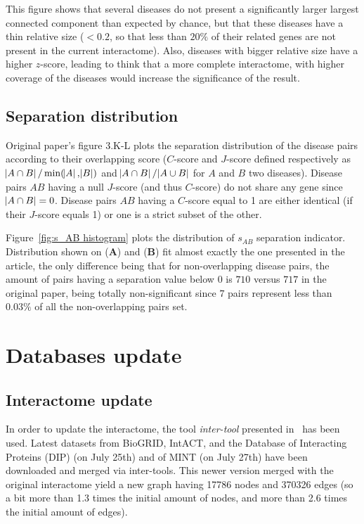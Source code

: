 \documentclass[letterpaper]{article}
\begin{document}
	This figure shows that several diseases do not present a significantly larger largest connected component
	than expected by chance, but that these diseases have a thin relative size ($< 0.2$, so that less than $20\%$
	of their related genes are not present in the current interactome). Also, diseases with bigger relative size
	have a higher $z$-score, leading to think that a more complete interactome, with higher coverage of the diseases
	would increase the significance of the result.

	\subsection{Separation distribution}
	Original paper's figure 3.K-L plots the separation distribution of the disease pairs according to their
	overlapping score ($C$-score and $J$-score defined respectively as $\abs {A \cap B}/\min(\abs A, \abs B)$ and
	$\abs {A \cap B}/\abs {A \cup B}$ for $A$ and $B$ two diseases). Disease pairs $AB$ having a null $J$-score
	(and thus $C$-score) do not share any gene since $\abs {A \cap B} = 0$. Disease pairs $AB$ having a $C$-score
	equal to 1 are either identical (if their $J$-score equals 1) or one is a strict subset of the other.

	Figure~\ref{fig:s_AB histogram} plots the distribution of $s_{AB}$ separation indicator.
	Distribution shown on ({\bf A}) and ({\bf B}) fit almost exactly the one presented in the article, the only difference
	being that for non-overlapping disease pairs, the amount of pairs having a separation value below 0 is $710$
	versus $717$ in the original paper, being totally non-significant since $7$ pairs represent less than
	$0.03\%$ of all the non-overlapping pairs set.


\section{Databases update}

	\subsection{Interactome update}
	In order to update the interactome, the tool \textit{inter-tool} presented in~\cite{inter-tools} has
	been used. Latest datasets from BioGRID, IntACT, and the Database of Interacting Proteins (DIP)
	(on July 25th) and of MINT (on July 27th) have been downloaded and merged via inter-tools. This newer
	version merged with the original interactome yield a new graph having 17786 nodes and 370326 edges
	(so a bit more than 1.3 times the initial amount of nodes, and more than 2.6 times the initial amount of edges).
\end{document}

